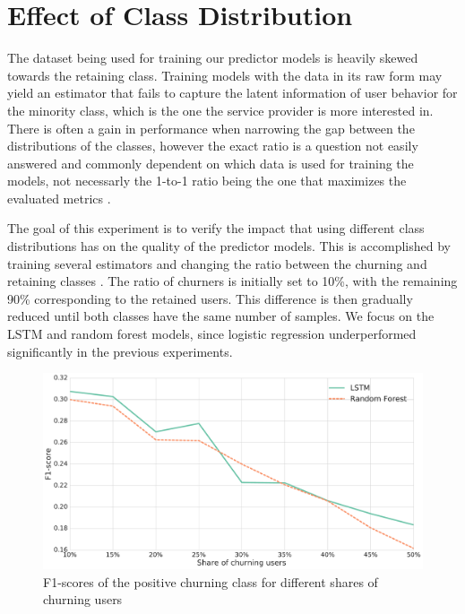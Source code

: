 \documentclass{kththesis}
\begin{document}
\section{Effect of Class Distribution}

The dataset being used for training our predictor models is heavily skewed towards the retaining class. Training models with the data in its raw form may yield an estimator that fails to capture the latent information of user behavior for the minority class, which is the one the service provider is more interested in. There is often a gain in performance when narrowing the gap between the distributions of the classes, however the exact ratio is a question not easily answered and commonly dependent on which data is used for training the models, not necessarly the 1-to-1 ratio being the one that maximizes the evaluated metrics \cite{Burez2009}.

The goal of this experiment is to verify the impact that using different class distributions has on the quality of the predictor models. This is accomplished by training several estimators and changing the ratio between the churning and retaining classes . The ratio of churners is initially set to 10\%, with the remaining 90\% corresponding to the retained users. This difference is then gradually reduced until both classes have the same number of samples. We focus on the LSTM and random forest models, since logistic regression underperformed significantly in the previous experiments.

\begin{figure}
    \centering
    \includegraphics[width=1.0\textwidth,keepaspectratio]{figures/line_class_balance.pdf}
    \caption{F1-scores of the positive churning class for different shares of churning users}
    \label{fig:line_class_balance}
\end{figure}
\end{document}
